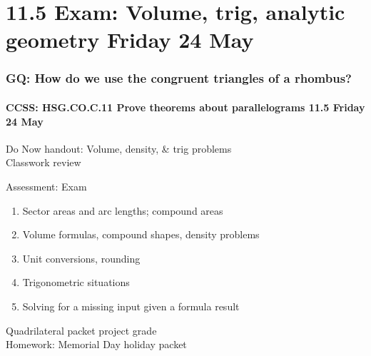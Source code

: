 \documentclass{beamer}
\begin{document}
\section{11.5 Exam: Volume, trig, analytic geometry Friday 24 May}
  \frame
  {
    \frametitle{GQ: How do we use the congruent triangles of a rhombus?}
    \framesubtitle{CCSS: HSG.CO.C.11 Prove theorems about parallelograms \hfill \alert{11.5 Friday 24 May}}

    Do Now handout: Volume, density, \& trig problems\\
    Classwork review
    \begin{block}{Assessment: Exam}
      \begin{enumerate}
        \item Sector areas and arc lengths; compound areas
        \item Volume formulas, compound shapes, density problems
        \item Unit conversions, rounding
        \item Trigonometric situations
        \item Solving for a missing input given a formula result
    \end{enumerate}
    \end{block}
    Quadrilateral packet project grade\\[0.5cm]
    Homework: Memorial Day holiday packet
  }
\end{document}
